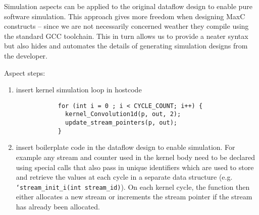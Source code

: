 Simulation aspects can be applied to the original dataflow design to
enable pure software simulation. This approach gives more freedom when
designing MaxC constructs -- since we are not necessarily concerned
weather they compile using the standard GCC toolchain. This in turn
allows us to provide a neater syntax but also hides and automates the
details of generating simulation designs from the developer.

Aspect steps:

\begin{enumerate}

\item insert kernel simulation loop in hostcode %
  \begin{figure}[!h]
    \begin{lstlisting}
      for (int i = 0 ; i < CYCLE_COUNT; i++) {
        kernel_Convolution1d(p, out, 2);
        update_stream_pointers(p, out);
      }
    \end{lstlisting}
  \end{figure}

\item insert boilerplate code in the dataflow design to enable simulation.
  For example any stream and counter used in the kernel body need to
  be declared using special calls that also pass in unique identifiers
  which are used to store and retrieve the values at each cycle in a
  separate data structure (e.g. \texttt{`stream\_init\_i(int
    stream\_id)}). On each kernel cycle, the function then either
  allocates a new stream or increments the stream pointer if the
  stream has already been allocated.
  \begin{comment}
    \begin{figure}[!h]
      \begin{lstlisting}
        float* i4 = count_i(1000, 1, 0);
        float* i1 = countChain_i(n1, 1, i4, 0);
      \end{lstlisting}
      \caption{Applying the simulation aspect to the dataflow design in
        Figure \ref{fig:maxc-1dconv}}
      \label{fig:maxc-sim-aspect}
    \end{figure}
  \end{comment}

\end{enumerate}


